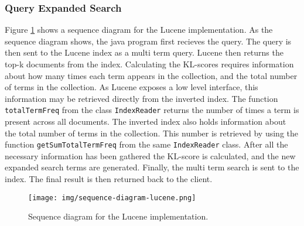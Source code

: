 \subsubsection{Query Expanded Search}
Figure \ref{fig:sequence-diagram-lucene} shows a sequence diagram for the Lucene implementation.
As the sequence diagram shows, the java program first recieves the query.
The query is then sent to the Lucene index as a multi term query.
Lucene then returns the top-k documents from the index.
Calculating the KL-scores requires information about how many times each term appears in the collection,
and the total number of terms in the collection.
As Lucene exposes a low level interface,
this information may be retrieved directly from the inverted index.
The function \texttt{totalTermFreq} from the class \texttt{IndexReader} returns the number of times a term is present across all documents.
The inverted index also holds information about the total number of terms in the collection.
This number is retrieved by using the function \texttt{getSumTotalTermFreq} from the same \texttt{IndexReader} class.
After all the necessary information has been gathered the KL-score is calculated,
and the new expanded search terms are generated.
Finally, the multi term search is sent to the index.
The final result is then returned back to the client.

\begin{figure}[h!]
  \centering \texttt{[image: img/sequence-diagram-lucene.png]}
  \caption{Sequence diagram for the Lucene implementation.}
  \label{fig:sequence-diagram-lucene}
\end{figure}
